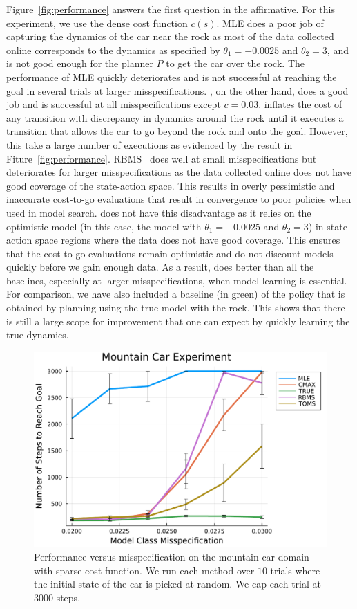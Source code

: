Figure~\ref{fig:performance} answers the first question in the
affirmative. For this experiment, we use the dense cost function
$c(s)$. MLE does a poor job of capturing the dynamics of the car
near the rock as most of the data collected online corresponds to the
dynamics as specified by $\theta_1 = -0.0025$ and $\theta_2 = 3$, and
is not good enough for the planner $P$ to get the car over the
rock. The performance of MLE quickly deteriorates and is not
successful at reaching the goal in several trials at larger
misspecifications. \cmax{},
on the other hand, does a good job and is successful at all
misspecifications except $c = 0.03$. \cmax{} inflates the cost of any
transition with discrepancy in dynamics around the rock until it
executes a transition that allows the car to go beyond the rock and
onto the goal. However, this take a large number of executions as
evidenced by the result in
Fiture~\ref{fig:performance}. RBMS~\cite{DBLP:conf/icra/JosephGRHR13}
does well at small misspecifications but deteriorates for larger
misspecifications as the data collected online does not have good
coverage of the state-action space. This results in overly pessimistic
and inaccurate cost-to-go evaluations that result in convergence to
poor policies when used in model search. \taml{} does not have this
disadvantage as it relies on the optimistic model (in this case, the
model with $\theta_1 = -0.0025$ and $\theta_2 = 3$) in state-action
space regions where the data does not have good coverage. This ensures
that the cost-to-go evaluations remain optimistic and do not discount
models quickly before we gain enough data. As a result, \taml{} does
better than all the baselines, especially at larger misspecifications,
when model learning is essential. For comparison, we have also
included a baseline (in green) of the policy that is obtained by
planning using the true model with the rock. This shows that there is
still a large scope for improvement that one can expect by quickly
learning the true dynamics.

\begin{figure}[t]
  \centering
\includegraphics[width=0.6\linewidth]{figures/taml/mountain_car_online_model_search_all.pdf}
  \caption{Performance versus misspecification on the mountain car
    domain with sparse cost function. We run each method over $10$
    trials where the initial state of the car is picked at random. We
    cap each trial at $3000$ steps.}
  \label{fig:sparse-performance}
\end{figure}


